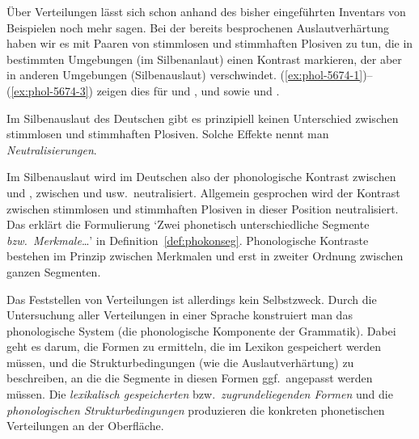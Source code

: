 Über Verteilungen lässt sich schon anhand des bisher eingeführten Inventars von Beispielen noch mehr sagen.
Bei der bereits besprochenen Auslautverhärtung haben wir es mit Paaren von stimmlosen und stimmhaften Plosiven zu tun, die in bestimmten Umgebungen (im Silbenanlaut) einen Kontrast markieren, der aber in anderen Umgebungen (Silbenauslaut) verschwindet.
(\ref{ex:phol-5674-1})--(\ref{ex:phol-5674-3}) zeigen dies für \textipa{[g]} und \textipa{[k]}, \textipa{[d]} und \textipa{[t]} sowie \textipa{[b]} und \textipa{[p]}.

\begin{exe}
  \ex\label{ex:phol-5674-1}
  \begin{xlist}
  \end{xlist}
  \ex\label{ex:phol-5674-2}
  \begin{xlist}
  \end{xlist}
  \ex\label{ex:phol-5674-3}
  \begin{xlist}
  \end{xlist}
\end{exe}

Im Silbenauslaut des Deutschen gibt es prinzipiell keinen Unterschied zwischen stimmlosen und stimmhaften Plosiven.
Solche Effekte nennt man \textit{Neutralisierungen}.


Im Silbenauslaut wird im Deutschen also der phonologische Kontrast zwischen \textipa{[g]} und \textipa{[k]}, zwischen \textipa{[d]} und \textipa{[t]} usw.\ neutralisiert.
Allgemein gesprochen wird der Kontrast zwischen stimmlosen und stimmhaften Plosiven in dieser Position neutralisiert.
Das erklärt die Formulierung `Zwei phonetisch unterschiedliche Segmente \textit{bzw.\ Merkmale}\ldots' in Definition~\ref{def:phokonseg}.
Phonologische Kontraste bestehen im Prinzip zwischen Merkmalen und erst in zweiter Ordnung zwischen ganzen Segmenten.

Das Feststellen von Verteilungen ist allerdings kein Selbstzweck.
Durch die Untersuchung aller Verteilungen in einer Sprache konstruiert man das phonologische System (die phonologische Komponente der Grammatik).
Dabei geht es darum, die Formen zu ermitteln, die im Lexikon gespeichert werden müssen, und die Strukturbedingungen (wie die Auslautverhärtung) zu beschreiben, an die die Segmente in diesen Formen ggf.\ angepasst werden müssen.
Die \textit{lexikalisch gespeicherten} bzw.\ \textit{zugrundeliegenden Formen} und die \textit{phonologischen Strukturbedingungen} produzieren die konkreten phonetischen Verteilungen an der Oberfläche.

